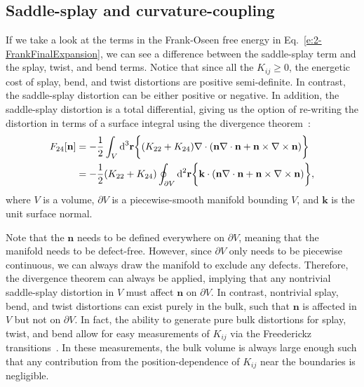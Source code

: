 \subsection{Saddle-splay and curvature-coupling}
If we take a look at the terms in the Frank-Oseen free energy in Eq.~\ref{e:2-FrankFinalExpansion}, we can see a difference between the saddle-splay term and the splay, twist, and bend terms.
Notice that since all the $K_{ij} \geq 0$, the energetic cost of splay, bend, and twist distortions are positive semi-definite.
In contrast, the saddle-splay distortion can be either positive or negative.
In addition, the saddle-splay distortion is a total differential, giving us the option of re-writing the distortion in terms of a surface integral using the divergence theorem~\cite{RN230}:
\begin{align}
  F_{24}[\mathbf{n}] &= - \frac{1}{2}\int_{V} \textup{d}^3  \mathbf{r} \bigg \{ (K_{22} + K_{24})  \nabla \cdot (\mathbf{n}\nabla \cdot \mathbf{n} + \mathbf{n} \times \nabla \times \mathbf{n}) \bigg \}\label{e:2-F24GaussA}  \\ &=
  - \frac{1}{2}(K_{22} + K_{24}) \oint_{\partial V} \textup{d}^2  \mathbf{r} \bigg \{   \mathbf{k} \cdot (\mathbf{n}\nabla \cdot \mathbf{n} + \mathbf{n} \times \nabla \times \mathbf{n}) \bigg \},\label{e:2-F24GaussB}
\end{align}
where $V$ is a volume, $\partial V$ is a piecewise-smooth manifold bounding $V$, and $\mathbf{k}$ is the unit surface normal.

Note that the $\mathbf{n}$ needs to be defined everywhere on $\partial V$, meaning that the manifold needs to be defect-free.
However, since $\partial V$ only needs to be piecewise continuous, we can always draw the manifold to exclude any defects.
Therefore, the divergence theorem can always be applied, implying that any nontrivial saddle-splay distortion in $V$ must affect $\mathbf{n}$ on $\partial V$.
In contrast, nontrivial splay, bend, and twist distortions can exist purely in the bulk, such that $\mathbf{n}$ is affected in $V$ but not on $\partial V$.
In fact, the ability to generate pure bulk distortions for splay, twist, and bend allow for easy measurements of $K_{ij}$ via the Freederickz transitions~\cite{RN212,RN213,RN33,RN188,RN182,RN183}.
In these measurements, the bulk volume is always large enough such that any contribution from the position-dependence of $K_{ij}$ near the boundaries is negligible.

